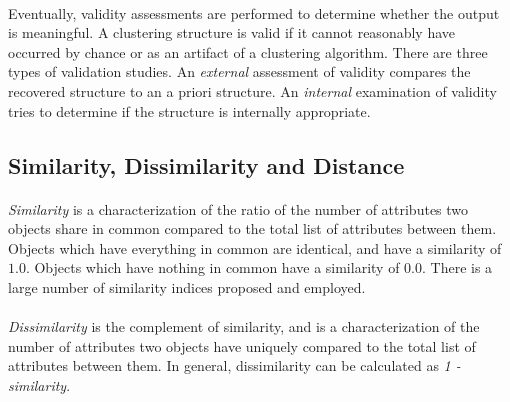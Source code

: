 \documentclass[10pt]{article}\usepackage[]{graphicx}\usepackage[]{color}
\begin{document}
\paragraph{}
Eventually, validity assessments are performed to determine
whether the output is meaningful. A clustering structure is valid if it cannot
reasonably have occurred by chance or as an artifact of a clustering algorithm.
There are three types of validation studies. An \textit{external} assessment of 
validity compares the recovered structure to an a priori structure. 
An \textit{internal} examination of validity tries to determine if the
structure is internally appropriate. 

\subsection{Similarity, Dissimilarity and Distance}
\paragraph{}
\textit{Similarity} is a characterization of the ratio of the number of attributes two 
objects share in common compared to the total list of attributes between them. 
Objects which have everything in common are identical, and have a similarity of 
$1.0$. Objects which have nothing in common have a similarity of $0.0$. 
There is a large number of similarity indices proposed and employed.
\paragraph{}
\textit{Dissimilarity} is the complement of similarity, and is a 
characterization of the number of attributes two objects have uniquely 
compared to the total list of attributes between them. 
In general, dissimilarity can be calculated as \textit{1 - similarity}.
\end{document}
